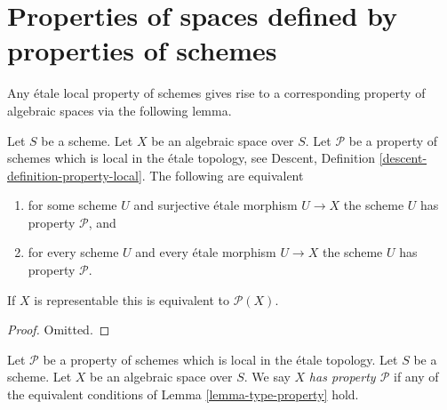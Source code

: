\section{Properties of spaces defined by properties of schemes}
\label{section-types-properties}

\noindent
Any \'etale local property of schemes gives rise to a corresponding
property of algebraic spaces via the following lemma.

\begin{lemma}
\label{lemma-type-property}
Let $S$ be a scheme.
Let $X$ be an algebraic space over $S$.
Let $\mathcal{P}$ be a property of schemes which is local in the \'etale
topology, see
Descent, Definition \ref{descent-definition-property-local}.
The following are equivalent
\begin{enumerate}
\item for some scheme $U$ and surjective \'etale morphism $U \to X$
the scheme $U$ has property $\mathcal{P}$, and
\item for every scheme $U$ and every \'etale morphism $U \to X$
the scheme $U$ has property $\mathcal{P}$.
\end{enumerate}
If $X$ is representable this is equivalent to $\mathcal{P}(X)$.
\end{lemma}

\begin{proof}
Omitted.
\end{proof}

\begin{definition}
\label{definition-type-property}
Let $\mathcal{P}$ be a property of schemes which is 
local in the \'etale topology.
Let $S$ be a scheme.
Let $X$ be an algebraic space over $S$.
We say $X$ {\it has property $\mathcal{P}$}
if any of the equivalent conditions of
Lemma \ref{lemma-type-property}
hold.
\end{definition}

